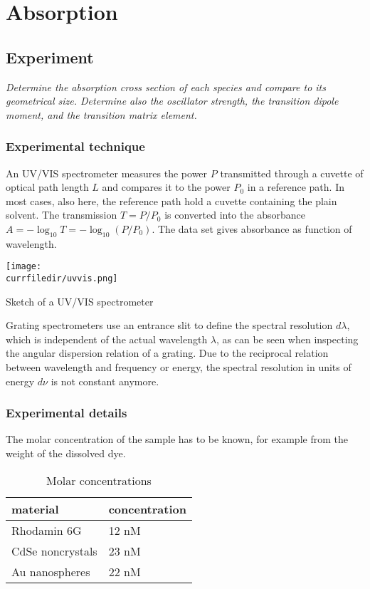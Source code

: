 

\chapter{Absorption}




\section{Experiment}

\textit{Determine the absorption cross section of each species and compare to its geometrical size. Determine also the oscillator strength, the transition dipole moment, and the transition matrix element.}


\subsection{Experimental technique}

An UV/VIS spectrometer measures the  power $P$ transmitted through a cuvette of optical path length $L$ and compares it to the power $P_0$ in a reference path. In most cases, also here, the reference path hold a cuvette containing  the plain solvent. The transmission $T = P / P_0$ is converted into the absorbance $A = - \log_{10} T = - \log_{10} ( P / P_0)$. The data set gives absorbance as function of wavelength.

\begin{marginfigure}
\texttt{[image: \\currfiledir/uvvis.png]}
\caption{Sketch of a UV/VIS spectrometer}
\end{marginfigure}



Grating spectrometers use an entrance slit to define the spectral resolution $d \lambda$, which is independent of the actual wavelength $\lambda$, as can be seen when inspecting the   angular dispersion relation of a grating. Due to the reciprocal relation between wavelength and frequency or energy, the spectral resolution in units of energy $d \nu$ is not constant anymore.


\subsection{Experimental details}

The molar concentration of the sample has to be known, for example from the weight of the dissolved dye. 

\begin{table}
 \begin{tabular}{ll}
  \toprule
   material & concentration \\
   \midrule
   Rhodamin 6G &  12 nM \\
   CdSe noncrystals & 23 nM \\
   Au nanospheres & 22 nM \\
   \bottomrule
\end{tabular}   
  \caption{Molar concentrations}
\end{table}


